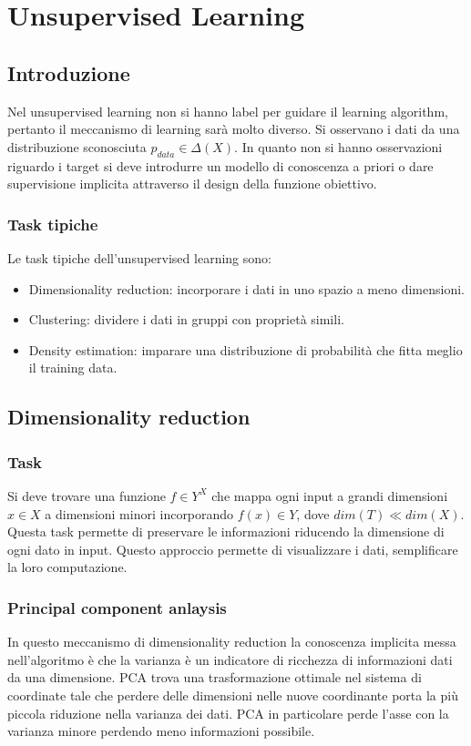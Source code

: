 \chapter{Unsupervised Learning}

\section{Introduzione}
Nel unsupervised learning non si hanno label per guidare il learning algorithm, pertanto il meccanismo di learning sar\`a molto diverso.
Si osservano i dati da una distribuzione sconosciuta $p_{data}\in\Delta(X)$.
In quanto non si hanno osservazioni riguardo i target si deve introdurre un modello di conoscenza a priori o dare supervisione implicita attraverso il design della funzione obiettivo.

	\subsection{Task tipiche}
	Le task tipiche dell'unsupervised learning sono:
	\begin{itemize}
		\item Dimensionality reduction: incorporare i dati in uno spazio a meno dimensioni.
		\item Clustering: dividere i dati in gruppi con propriet\`a simili.
		\item Density estimation: imparare una distribuzione di probabilit\`a che fitta meglio il training data.
	\end{itemize}

\section{Dimensionality reduction}

	\subsection{Task}
	Si deve trovare una funzione $f\in Y^X$ che mappa ogni input a grandi dimensioni $x\in X$ a dimensioni minori incorporando $f(x)\in Y$, dove $dim(T)\ll dim(X)$.
	Questa task permette di preservare le informazioni riducendo la dimensione di ogni dato in input.
	Questo approccio permette di visualizzare i dati, semplificare la loro computazione.

	\subsection{Principal component anlaysis}
	In questo meccanismo di dimensionality reduction la conoscenza implicita messa nell'algoritmo \`e che la varianza \`e un indicatore di ricchezza di informazioni dati da una dimensione.
	PCA trova una trasformazione ottimale nel sistema di coordinate tale che perdere delle dimensioni nelle nuove coordinante porta la pi\`u piccola riduzione nella varianza dei dati.
	PCA in particolare  perde l'asse con la varianza minore perdendo meno informazioni possibile.

